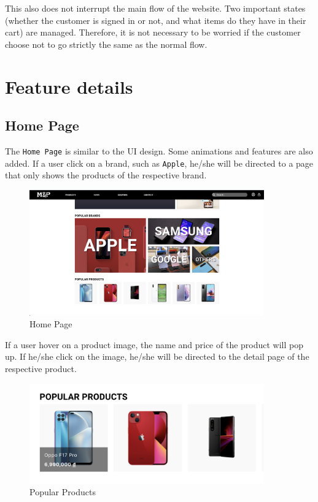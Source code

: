 \documentclass[a4paper]{article}
\numberwithin{equation}{section}
\begin{document}
This also does not interrupt the main flow of the website.
Two important states (whether the customer is signed in or not, and what items do they have in their cart) are managed.
Therefore, it is not necessary to be worried if the customer choose not to go strictly the same as the normal flow.

\newpage

\section{Feature details}

\subsection{Home Page}

The {\tt Home Page} is similar to the UI design.
Some animations and features are also added.
If a user click on a brand, such as {\tt Apple}, he/she will be directed to a page that only shows the products of the respective brand.

\begin{figure}[H]
  \centering
  \includegraphics[width=0.9\textwidth]{assets/flow/home.png}
  \caption{Home Page}
\end{figure}

If a user hover on a product image, the name and price of the product will pop up.
If he/she click on the image, he/she will be directed to the detail page of the respective product.

\begin{figure}[H]
  \centering
  \includegraphics[width=0.9\textwidth]{assets/flow/product-pop.png}
  \caption{Popular Products}
\end{figure}
\end{document}

